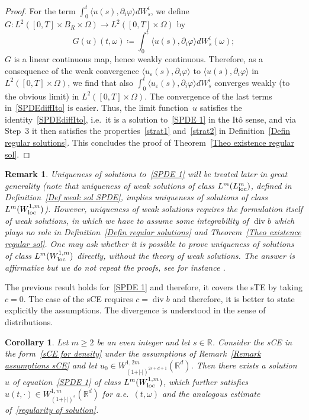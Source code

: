 \documentclass[a4paper,10pt]{article}
\newtheorem{corollary}[theorem]{Corollary}
\newtheorem{remark}[theorem]{Remark}
\newcommand\1{\mathbbm{1}}
\newcommand{\lan}{\langle}
\newcommand{\ran}{\rangle}
\newcommand{\eps}{\varepsilon}
\newcommand\loc{{\rm loc}}
\DeclareMathOperator{\diverg}{div}
\numberwithin{equation}{section}
\begin{document}
\begin{proof}
For the term $\int^t_0\lan u(s),\partial_i\varphi\ran dW^i_s$, we define $G \colon L^2([0,T]\times B_R\times\Omega)\rightarrow L^2([0,T]\times\Omega)$ by
\begin{equation*}
G(u)(t,\omega)\coloneqq \int^t_0\lan u(s),\partial_i\varphi\ran dW^i_s(\omega);
\end{equation*}
$G$ is a linear continuous map, hence weakly continuous. Therefore, as a consequence of the weak convergence $\lan u_\eps (s),\partial_i\varphi\ran$ to $\lan u (s),\partial_i\varphi\ran$ in $L^2([0,T]\times\Omega)$, we find that also $\int^t_0\lan u_\eps (s),\partial_i\varphi\ran dW^i_s$ converges weakly (to the obvious limit) in $L^2([0,T]\times\Omega)$. The convergence of the last terms in~\eqref{SPDEdiffIto} is easier. Thus, the limit function~$u$ satisfies the identity~\eqref{SPDEdiffIto}, i.e.~it is a solution to~\eqref{SPDE 1} in the It\^o sense, and via Step~3 it then satisfies the properties~\ref{strat1} and~\ref{strat2} in Definition~\ref{Defin regular solutions}. This concludes the proof of Theorem~\ref{Theo existence regular sol}.
\end{proof}

\begin{remark}
\label{Remark uniqueness regular}
Uniqueness of solutions to~\eqref{SPDE 1} will be treated later in great generality \textup{(}note that uniqueness of weak solutions of class $L^{m}(L^{m}_\loc)$, defined in Definition~\ref{Def weak sol SPDE}, implies uniqueness of solutions of class $L^m(W_{\loc}^{1,m})$\textup{)}. However, uniqueness of weak solutions requires the formulation itself of weak solutions, in which we have to assume some integrability of $\diverg b$ which plays no role in Definition~\ref{Defin regular solutions} and Theorem~\ref{Theo existence regular sol}. One may ask whether it is possible to prove uniqueness of solutions of class $L^m(W_{\loc}^{1,m})$ directly, without the theory of weak solutions. The answer is affirmative but we do not repeat the proofs, see for instance \textup{\cite[Appendix A]{FLAGUBPRI10}}. 
\end{remark}

The previous result holds for~\eqref{SPDE 1} and therefore, it covers the sTE by taking $c=0$. The case of the sCE requires $c=\diverg b$ and therefore, it is better to state explicitly the assumptions. The divergence is understood in the sense of distributions.

\begin{corollary}
Let $m\geq2$ be an even integer and let $s\in\mathbb{R}$. Consider the sCE in the form~\eqref{sCE for density} under the assumptions of
Remark~\ref{Remark assumptions sCE} and let $u_{0}\in W_{(1+\vert \cdot\vert )^{2s+d+1}}^{1,2m}(\mathbb{R}^{d})$. Then there exists a solution~$u$ of equation~\eqref{SPDE 1} of class $L^m(W_{\loc}^{1,m})$, which further satisfies $u(t,\cdot)\in W_{(  1+\vert \cdot \vert )^{s}}^{1,m}(\mathbb{R}^{d})$ for a.e.~$(t,\omega)$
and the analogous estimate of~\eqref{regularity of solution}.
\end{corollary}
\end{document}
